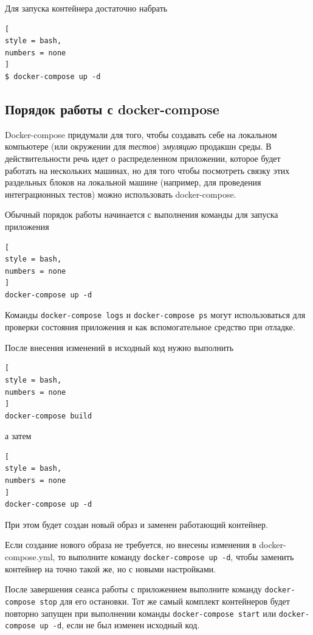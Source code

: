 \documentclass[%
	11pt,
	a4paper,
	utf8,
		]{article}
\begin{document}
Для запуска контейнера достаточно набрать
\begin{lstlisting}[
style = bash,
numbers = none
]
$ docker-compose up -d
\end{lstlisting}

\subsection{Порядок работы с docker-compose}

Docker-compose придумали для того, чтобы создавать себе на локальном компьютере (или окружении для \emph{тестов}) \emph{эмуляцию} продакшн среды. В действительности речь идет о распределенном приложении, которое будет работать на нескольких машинах, но для того чтобы посмотреть связку этих раздельных блоков на локальной машине (например, для проведения интеграционных тестов) можно использовать docker-compose.

Обычный порядок работы начинается с выполнения команды для запуска приложения
\begin{lstlisting}[
style = bash,
numbers = none
]
docker-compose up -d
\end{lstlisting}

Команды \texttt{docker-compose logs} и \texttt{docker-compose ps} могут использоваться для проверки состояния приложения и как вспомогательное средство при отладке.

После внесения изменений в исходный код нужно выполнить
\begin{lstlisting}[
style = bash,
numbers = none
]
docker-compose build
\end{lstlisting}
а затем 
\begin{lstlisting}[
style = bash,
numbers = none
]
docker-compose up -d
\end{lstlisting}

При этом будет создан новый образ и заменен работающий контейнер.


Если создание нового образа не требуется, но внесены изменения в docker-compose.yml, то выполните команду \texttt{docker-compose up -d}, чтобы заменить контейнер на точно такой же, но с новыми настройками.

После завершения сеанса работы с приложением выполните команду \texttt{docker-compose stop} для его остановки. Тот же самый комплект контейнеров будет повторно запущен при выполнении команды \texttt{docker-compose start} или \texttt{docker-compose up -d}, если не был изменен исходный код.
\end{document}
